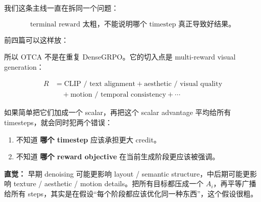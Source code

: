 我们这条主线一直在拆同一个问题：

\[
\text{terminal reward 太粗，不能说明哪个 timestep 真正导致好结果。}
\]

前四篇可以这样放：

\begin{center}
\end{center}

所以 OTCA 不是在重复 DenseGRPO。它的切入点是 multi-reward visual generation：

\[
\begin{aligned}
R
&=
\text{CLIP / text alignment}
+
\text{aesthetic / visual quality}\\
&\quad
+
\text{motion / temporal consistency}
+
\cdots
\end{aligned}
\]

如果简单把它们加成一个 scalar，再把这个 scalar advantage 平均给所有 timesteps，就会同时犯两个错误：

\begin{enumerate}[leftmargin=1.5em]
  \item 不知道 \textbf{哪个 timestep} 应该承担更大 credit。
  \item 不知道 \textbf{哪个 reward objective} 在当前生成阶段更应该被强调。
\end{enumerate}

\begin{intubox}
\textbf{直觉：} 早期 denoising 可能更影响 layout / semantic structure，中后期可能更影响 texture / aesthetic / motion details。把所有目标都压成一个 \(A_i\)，再平等广播给所有 steps，其实是在假设“每个阶段都应该优化同一种东西”，这个假设很粗。
\end{intubox}

